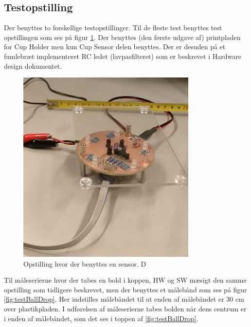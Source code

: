 \documentclass[Modultest/Modultest_main.tex]{subfiles}
\begin{document}
\subsection{Testopstilling}
Der benyttes to forskellige testopstillinger.
Til de fleste test benyttes test opstillingen som ses på figur \ref{fig:testOneSensor}. Der benyttes (den første udgave af) printpladen for Cup Holder men kun Cup Sensor delen benyttes. Der er desuden på et fumlebræt implementeret RC ledet (lavpasfilteret) som er beskrevet i Hardware design dokumentet. 

\begin{figure}[H]
    \centering
    \includegraphics[width=0.8\textwidth]{Modultest/CupSensor/testOpstilling/testOneSensor.png}
    \caption{Opstilling hvor der benyttes en sensor. D}
    \label{fig:testOneSensor}
\end{figure}

Til måleserierne hvor der tabes en bold i koppen, HW og SW mæsigt den samme opstilling som tidligere beskrevet, men der benyttes et målebånd som ses på figur \ref{fig:testBallDrop}. Her indstilles målebåndet til at enden af målebåndet er 30 cm over plastikpladen. I udførelsen af måleserierne tabes bolden når dens centrum er i enden af målebåndet, som det ses i toppen af \ref{fig:testBallDrop}.
\end{document}
